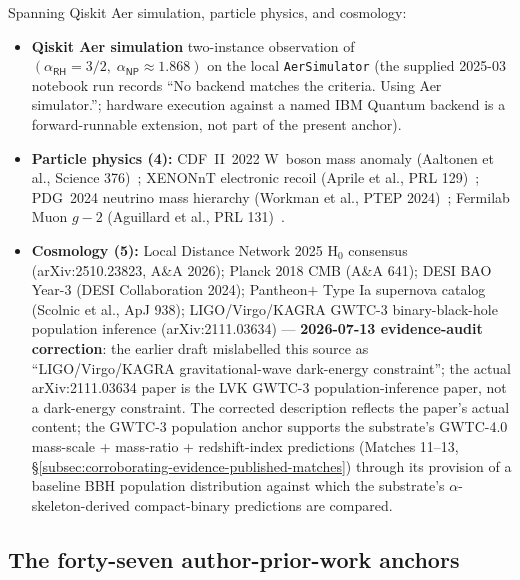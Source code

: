 \documentclass[11pt,a4paper]{amsart}
\theoremstyle{plain}
\theoremstyle{definition}
\begin{document}
Spanning Qiskit Aer simulation, particle physics, and cosmology:
\begin{itemize}[itemsep=2pt]
\item \textbf{Qiskit Aer simulation} two-instance observation of $(\alpha_{\textsf{RH}}=3/2,\;\alpha_{\textsf{NP}}\approx 1.868)$ on the local \texttt{AerSimulator} (the supplied 2025-03 notebook run records ``No backend matches the criteria. Using Aer simulator.''; hardware execution against a named IBM Quantum backend is a forward-runnable extension, not part of the present anchor).
\item \textbf{Particle physics (4):} CDF~II~2022 W~boson mass anomaly (Aaltonen et al., Science 376)~\cite{cdf2022wboson}; XENONnT electronic recoil (Aprile et al., PRL 129)~\cite{xenon-collab}; PDG~2024 neutrino mass hierarchy (Workman et al., PTEP 2024)~\cite{pdg2024}; Fermilab Muon $g-2$ (Aguillard et al., PRL 131)~\cite{fermilab-muon-g-2}.
\item \textbf{Cosmology (5):} Local Distance Network 2025 H$_0$ consensus (arXiv:2510.23823, A\&A 2026); Planck 2018 CMB (A\&A 641); DESI BAO Year-3 (DESI Collaboration 2024); Pantheon$+$ Type Ia supernova catalog (Scolnic et al., ApJ 938); LIGO/Virgo/KAGRA GWTC-3 binary-black-hole population inference (arXiv:2111.03634) --- \textbf{2026-07-13 evidence-audit correction}: the earlier draft mislabelled this source as ``LIGO/Virgo/KAGRA gravitational-wave dark-energy constraint''; the actual arXiv:2111.03634 paper is the LVK GWTC-3 population-inference paper, not a dark-energy constraint. The corrected description reflects the paper's actual content; the GWTC-3 population anchor supports the substrate's GWTC-4.0 mass-scale + mass-ratio + redshift-index predictions (Matches 11--13, \S\ref{subsec:corroborating-evidence-published-matches}) through its provision of a baseline BBH population distribution against which the substrate's $\alpha$-skeleton-derived compact-binary predictions are compared.
\end{itemize}

\subsection{The forty-seven author-prior-work anchors}
\end{document}
